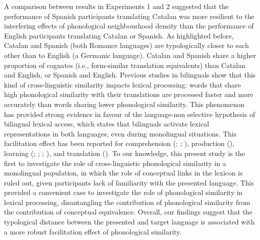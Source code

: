 \documentclass[
]{article}
\begin{document}
A comparison between results in Experiments 1 and 2 suggested that the
performance of Spanish participants translating Catalan was more
resilient to the interfering effects of phonological neighbourhood
density than the performance of English participants translating Catalan
or Spanish. As highlighted before, Catalan and Spanish (both Romance
languages) are typologically closer to each other than to English (a
Germanic language). Catalan and Spanish share a higher proportion of
cognates (i.e., form-similar translation equivalents) than Catalan and
English, or Spanish and English. Previous studies in bilinguals show
that this kind of cross-linguistic similarity impacts lexical
processing: words that share high phonological similarity with their
translations are processed faster and more accurately than words sharing
lower phonological similarity. This phenomenon has provided strong
evidence in favour of the language-non selective hypothesis of bilingual
lexical access, which states that bilinguals activate lexical
representations in both languages, even during monolingual situations.
This facilitation effect has been reported for comprehension
(;
;
), production
(), learning
(;
;
;
), and translation
(). To
our knowledge, this present study is the first to investigate the role
of cross-linguistic phonological similarity in a monolingual population,
in which the role of conceptual links in the lexicon is ruled out, given
participants lack of familiarity with the presented language. This
provided a convenient case to investigate the role of phonological
similarity in lexical processing, disantangling the contribution of
phonological similarity from the contribution of conceptual equivalence.
Overall, our findings suggest that the typological distance between the
presented and target language is associated with a more robust
facilitation effect of phonological similarity.
\end{document}
